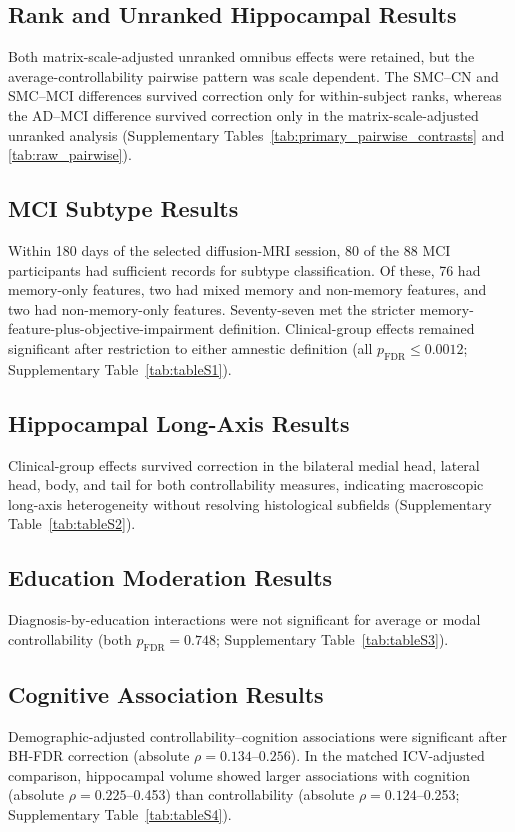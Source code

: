 \documentclass{article}
\begin{document}
\subsection{Rank and Unranked Hippocampal Results}
Both matrix-scale-adjusted unranked omnibus effects were retained, but the average-controllability pairwise pattern was scale dependent. The SMC--CN and SMC--MCI differences survived correction only for within-subject ranks, whereas the AD--MCI difference survived correction only in the matrix-scale-adjusted unranked analysis (Supplementary Tables~\ref{tab:primary_pairwise_contrasts} and \ref{tab:raw_pairwise}).

\subsection{MCI Subtype Results}
Within 180 days of the selected diffusion-MRI session, 80 of the 88 MCI participants had sufficient records for subtype classification. Of these, 76 had memory-only features, two had mixed memory and non-memory features, and two had non-memory-only features. Seventy-seven met the stricter memory-feature-plus-objective-impairment definition. Clinical-group effects remained significant after restriction to either amnestic definition (all \(p_{\mathrm{FDR}}\leq0.0012\); Supplementary Table~\ref{tab:tableS1}).

\subsection{Hippocampal Long-Axis Results}
Clinical-group effects survived correction in the bilateral medial head, lateral head, body, and tail for both controllability measures, indicating macroscopic long-axis heterogeneity without resolving histological subfields (Supplementary Table~\ref{tab:tableS2}).

\subsection{Education Moderation Results}
Diagnosis-by-education interactions were not significant for average or modal controllability (both \(p_{\mathrm{FDR}}=0.748\); Supplementary Table~\ref{tab:tableS3}).

\subsection{Cognitive Association Results}
Demographic-adjusted controllability--cognition associations were significant after BH-FDR correction (absolute \(\rho=0.134\text{--}0.256\)). In the matched ICV-adjusted comparison, hippocampal volume showed larger associations with cognition (absolute \(\rho=0.225\)--0.453) than controllability (absolute \(\rho=0.124\)--0.253; Supplementary Table~\ref{tab:tableS4}).
\end{document}
